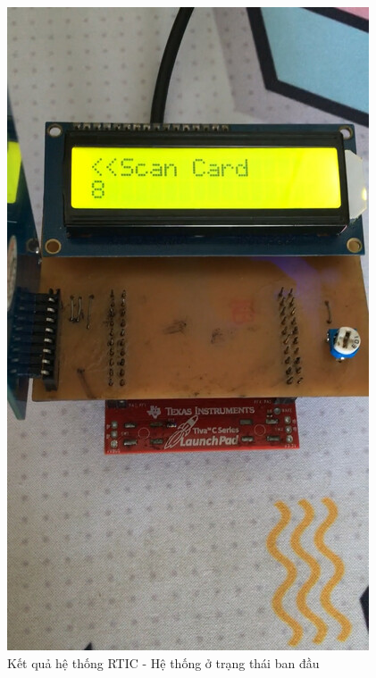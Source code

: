 \begin{figure}[ht]
\centering
\includegraphics[scale=0.3]{images/rtic_init.jpg}
\caption{Kết quả hệ thống RTIC - Hệ thống ở trạng thái ban đầu}
\label{fig:rtic_init}
\end{figure}


